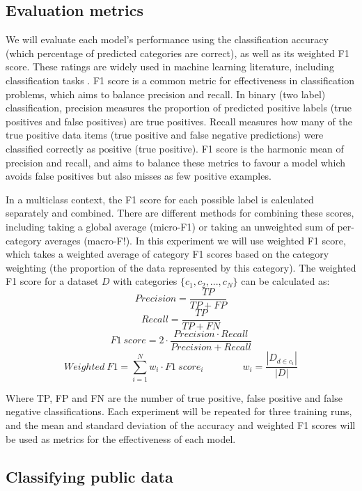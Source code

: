 \documentclass{l4proj}
\begin{document}
\subsection{Evaluation metrics}
We will evaluate each model's performance using the  classification accuracy (which percentage of predicted categories are correct), as well as its weighted F1 score. These ratings are widely used in machine learning literature, including classification tasks \citep{alam2020bangla, al2020multiple, ranasinghe2020multilingual}. F1 score is a common metric for effectiveness in classification problems, which aims to balance precision and recall. In binary (two label) classification, precision measures the proportion of predicted positive labels (true positives and false positives) are true positives. Recall measures how many of the true positive data items (true positive and false negative predictions) were classified correctly as positive (true positive). F1 score is the harmonic mean of precision and recall, and aims to balance these metrics to favour a model which avoids false positives but also misses as few positive examples. \par
In a multiclass context, the F1 score for each possible label is calculated separately and combined. There are different methods for combining these scores, including taking a global average (micro-F1) or taking an unweighted sum of per-category averages (macro-F!). In this experiment we will use weighted F1 score, which takes a weighted average of category F1 scores based on the category weighting (the proportion of the data represented by this category). The weighted F1 score for a dataset $D$ with categories $\{c_1, c_2, ..., c_N\}$ can be calculated as:
$$Precision=\frac{TP}{TP+FP}$$ 
$$Recall=\frac{TP}{TP+FN}
$$ $$F1 \ score=2 \cdot \frac{Precision \cdot Recall}{Precision + Recall}$$
$$Weighted \ F1=\sum_{i=1}^{N}w_i \cdot F1 \ score_i \quad \quad \quad \quad w_i=\frac{|D_{d \in c_i}|}{|D|}$$

Where TP, FP and FN are the number of true positive, false positive and false negative classifications. Each experiment will be repeated for three training runs, and the mean and standard deviation of the accuracy and weighted F1 scores will be used as metrics for the effectiveness of each model.
\subsection{Classifying public data}
\end{document}
